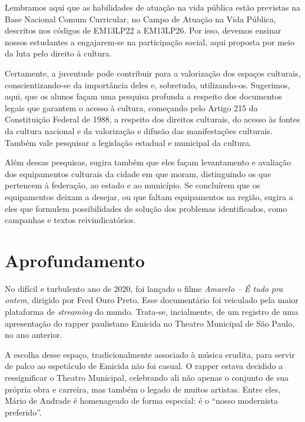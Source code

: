 \documentclass[11pt]{extarticle}
\begin{document}
Lembramos aqui que as habilidades de atuação na vida pública estão
previstas na Base Nacional Comum Curricular, no Campo de Atuação na Vida
Pública, descritos nos códigos de EM13LP22 a EM13LP26. Por isso, devemos
ensinar nossos estudantes a engajarem-se na participação social, aqui
proposta por meio da luta pelo direito à cultura.

Certamente, a juventude pode contribuir para a valorização dos espaços
culturais, conscientizando-se da importância deles e, sobretudo,
utilizando-os. Sugerimos, aqui, que os alunos façam uma pesquisa
profunda a respeito dos documentos legais que garantem o acesso à
cultura, começando pelo Artigo 215 da Constituição Federal de 1988, a
respeito dos direitos culturais, do acesso às fontes da cultura nacional
e da valorização e difusão das manifestações culturais. Também vale
pesquisar a legislação estadual e municipal da cultura.


Além dessas pesquisas, sugira também que eles façam levantamento e
avaliação dos equipamentos culturais da cidade em que moram,
distinguindo os que pertencem à federação, ao estado e ao município. Se
concluírem que os equipamentos deixam a desejar, ou que faltam
equipamentos na região, sugira a eles que formulem possibilidades de
solução dos problemas identificados, como campanhas e textos
reivindicatórios.

\section{Aprofundamento}

No difícil e turbulento ano de 2020, foi lançado o filme \emph{Amarelo
-- É tudo pra ontem}, dirigido por Fred Ouro Preto. Esse documentário
foi veiculado pela maior plataforma de \emph{streaming} do mundo.
Trata-se, incialmente, de um registro de uma apresentação do rapper
paulistano Emicida no Theatro Municipal de São Paulo, no ano anterior.

A escolha desse espaço, tradicionalmente associado à música erudita,
para servir de palco ao espetáculo de Emicida não foi casual. O rapper
estava decidido a ressignificar o Theatro Municipal, celebrando ali não
apenas o conjunto de sua própria obra e carreira, mas também o legado de
muitos artistas. Entre eles, Mário de Andrade é homenageado de forma
especial: é o ``nosso modernista preferido''.
\end{document}
